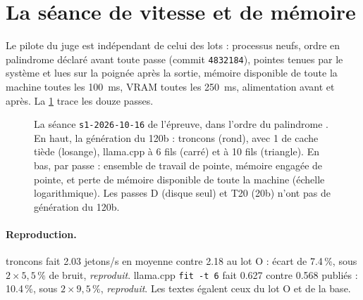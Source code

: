 \section{La séance de vitesse et de mémoire}\label{t2e-sec:seance}

Le pilote du juge est indépendant de celui des lots : processus neufs, ordre en palindrome déclaré avant toute passe (commit \texttt{4832184}), pointes tenues par le système et lues sur la poignée après la sortie, mémoire disponible de toute la machine toutes les \SI{100}{\milli\second}, VRAM toutes les \SI{250}{\milli\second}, alimentation avant et après. La \cref{t2e-fig:seance} trace les douze passes.

\begin{figure}[ht]
\centering
\GrapheResSeance
\caption[La séance de l'épreuve, passe par passe]{La séance \texttt{s1-2026-10-16} de l'épreuve, dans l'ordre du palindrome \mes. En haut, la génération du 120b : troncons (rond), avec \SI{1}{\Go} de cache tiède (losange), llama.cpp à 6 fils (carré) et à 10 fils (triangle). En bas, par passe : ensemble de travail de pointe, mémoire engagée de pointe, et perte de mémoire disponible de toute la machine (échelle logarithmique). Les passes D (disque seul) et T20 (20b) n'ont pas de génération du 120b.}
\label{t2e-fig:seance}
\end{figure}

\paragraph{Reproduction.} troncons fait \num{2.03} jetons/s en moyenne contre \num{2.18} au lot O : écart de \num{7.4}\,\%, sous $2 \times 5{,}5\,\%$ de bruit, \emph{reproduit}. llama.cpp \texttt{fit -t 6} fait \num{0.627} contre \num{0.568} publiés : \num{10.4}\,\%, sous $2 \times 9{,}5\,\%$, \emph{reproduit}. Les textes égalent ceux du lot O et de la base.


